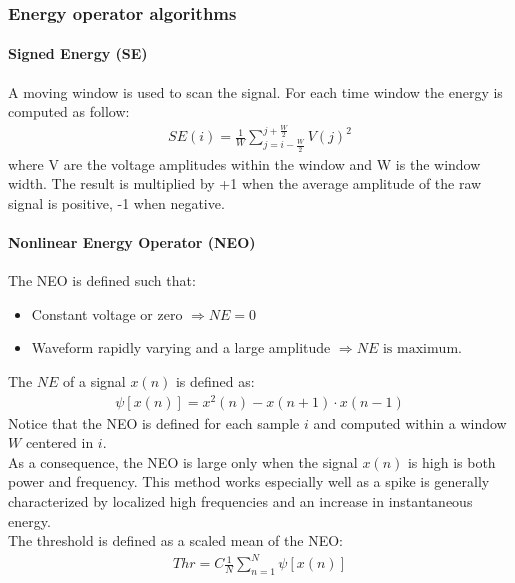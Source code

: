 \subsubsection{Energy operator algorithms}
\paragraph{Signed Energy (SE)}
A moving window is used to scan the signal. For each time window the energy is
computed as follow:
\begin{align*}
    SE(i)=\frac{1}{W}\sum_{j=i-\frac{W}{2}}^{j+\frac{W}{2}}V(j)^2
\end{align*}
where V are the voltage amplitudes within the window and W is the window width.
The result is multiplied by +1 when the average amplitude of the raw signal is
positive, -1 when negative.
\paragraph{Nonlinear Energy Operator (NEO)}
The NEO is defined such that:
\begin{itemize}
    \item Constant voltage or zero \(\Rightarrow NE=0\)
    \item Waveform rapidly varying and a large amplitude
    \(\Rightarrow NE \text{ is maximum}\).
\end{itemize}
The \(NE\) of a signal \(x(n)\) is defined as:
\begin{align*}
    \psi[x(n)]=x^2(n)-x(n+1)\cdot x(n-1)
\end{align*}
Notice that the NEO is defined for each sample \(i\) and computed within a
window \(W\) centered in \(i\).\\
As a consequence, the NEO is large only when the signal \(x(n)\) is high is both
power and frequency. This method works especially well as a spike is generally
characterized by localized high frequencies and an increase in instantaneous
energy.\\
The threshold is defined as a scaled mean of the NEO:
\begin{align*}
    Thr=C\frac{1}{N}\sum_{n=1}^{N}\psi[x(n)]
\end{align*}
